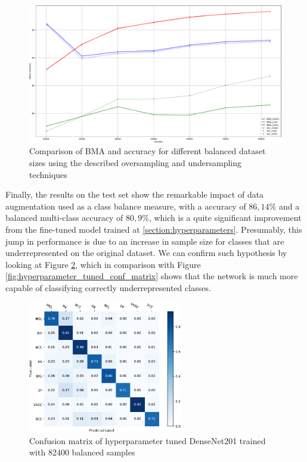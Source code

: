     \begin{figure}[ht]
        \centering
        \includegraphics[width=\textwidth]{figs/densenet201_balanced_samples_metrics_comp.pdf}
        \caption{Comparison of \ac{BMA} and accuracy for different balanced dataset sizes using the described oversampling and undersampling techniques}
        \label{fig:densenet201_balanced_samples_metrics_comp}
    \end{figure}

    Finally, the results on the test set show the remarkable impact of data augmentation used as a class balance measure, with a accuracy of $86,14\%$ and a balanced multi-class accuracy of $80,9\%$, which is a quite significant improvement from the fine-tuned model trained at \autoref{section:hyperparameters}. Presumably, this jump in performance is due to an increase in sample size for classes that are underrepresented on the original dataset. We can confirm such hypothesis by looking at Figure \ref{fig:82400_balanced_conf_matrix}, which in comparison with Figure \ref{fig:hyperparameter_tuned_conf_matrix} shows that the network is much more capable of classifying correctly underrepresented classes. \par
    \begin{figure}[ht]
        \centering
        \includegraphics[width=0.6\textwidth]{figs/densenet201_82400_balanced_conf_matrix.pdf}
        \caption{Confusion matrix of hyperparameter tuned DenseNet201 trained with 82400 balanced samples}
        \label{fig:82400_balanced_conf_matrix}
    \end{figure}
    
